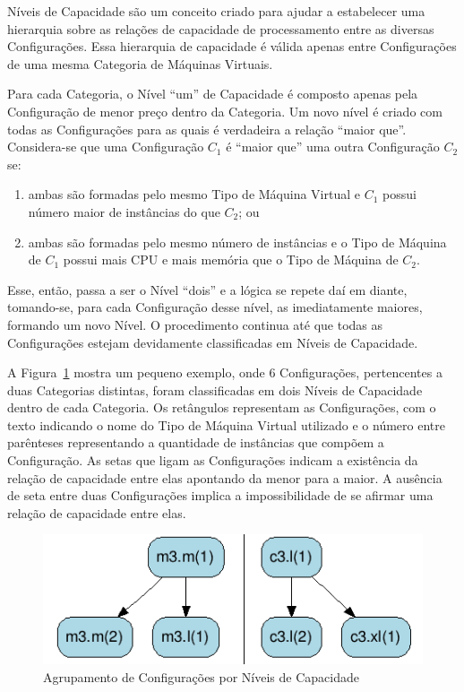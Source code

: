 Níveis de Capacidade são um conceito criado para ajudar a estabelecer uma hierarquia 
sobre as relações de capacidade de processamento entre as diversas Configurações. 
Essa hierarquia de capacidade é válida apenas entre Configurações de uma mesma 
Categoria de Máquinas Virtuais. 

Para cada Categoria, o Nível ``um'' de Capacidade é composto apenas pela Configuração 
de menor preço dentro da Categoria. Um novo nível é criado com todas as Configurações 
para as quais é verdadeira a relação ``maior que''. Considera-se que uma 
Configuração $C_1$ é ``maior que'' uma outra Configuração $C_2$ se: 

\begin{enumerate}[label=\bfseries \alph*)]
\item ambas são formadas pelo mesmo Tipo de Máquina Virtual e $C_1$ possui 
número maior de instâncias do que $C_2$; ou
\item ambas são formadas pelo mesmo número de instâncias
e o Tipo de Máquina de $C_1$ possui mais CPU e mais memória que o Tipo de Máquina
de $C_2$.  
\end{enumerate}

Esse, então, passa a ser o Nível 
``dois'' e a lógica se repete daí em diante, tomando-se, para cada Configuração 
desse nível, as imediatamente maiores, formando um novo Nível. O procedimento 
continua até que todas as Configurações estejam devidamente classificadas em 
Níveis de Capacidade.

A Figura~\ref{fig_niveis_capacidade} mostra um pequeno exemplo, onde 6 Configurações,
pertencentes a duas Categorias distintas, foram classificadas em dois Níveis de 
Capacidade dentro de cada Categoria. Os retângulos representam as Configurações, 
com o texto indicando o nome do Tipo de Máquina Virtual utilizado e o número entre 
parênteses representando a quantidade de instâncias que compõem a Configuração. 
As setas que ligam as Configurações indicam a existência da relação de capacidade 
entre elas apontando da menor para a maior. A ausência de seta entre duas Configurações 
implica a impossibilidade de se afirmar uma relação de capacidade entre elas. 

\begin{figure}[t]
  \begin{center}
    \includegraphics[scale=.65]{img/exemplo-niveis-capacidade}
  \end{center}
  \caption{\label{fig_niveis_capacidade}Agrupamento de Configurações por Níveis de Capacidade}
\end{figure}


